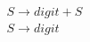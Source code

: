 \documentclass[preview]{standalone}
\begin{document}
\begin{align*}
S \longrightarrow digit + S \\ S \longrightarrow digit
\end{align*}
\end{document}
